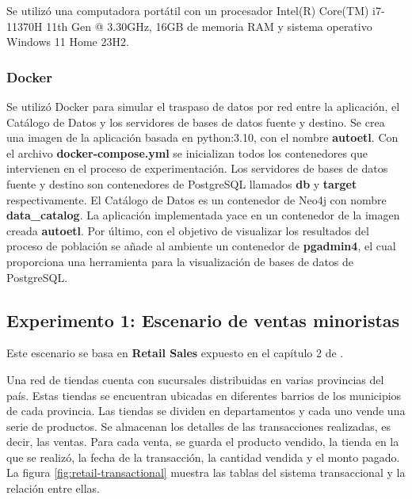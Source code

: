 Se utilizó una computadora portátil con un procesador Intel(R) Core(TM) i7-11370H 11th Gen @ 3.30GHz, 16GB de 
memoria RAM y sistema operativo Windows 11 Home 23H2.

\subsubsection{Docker}

Se utilizó Docker para simular el traspaso de datos por red entre la aplicación, el Catálogo de Datos y 
los servidores de bases de datos fuente y destino. Se crea una imagen de la aplicación basada en python:3.10, con el 
nombre \textbf{autoetl}. 
Con el archivo \textbf{docker-compose.yml} se inicializan todos los contenedores que intervienen en el proceso 
de experimentación. Los servidores de bases de datos fuente y destino son contenedores de PostgreSQL llamados 
\textbf{db} y \textbf{target} respectivamente. El Catálogo de Datos es un contenedor de Neo4j con nombre 
\textbf{data\_catalog}. La aplicación implementada yace en un contenedor de la imagen creada \textbf{autoetl}. 
Por \'ultimo, con el objetivo de visualizar los resultados del proceso de población se añade al ambiente un 
contenedor de \textbf{pgadmin4}, el cual proporciona una herramienta para la visualización de bases de datos 
de PostgreSQL.

\subsection{Experimento 1: Escenario de ventas minoristas}

Este escenario se basa en \textbf{Retail Sales} expuesto en el capítulo 2
de \cite{kimball2011data}. 

Una red de tiendas cuenta con sucursales distribuidas en varias provincias del país. Estas tiendas se encuentran ubicadas 
en diferentes barrios de los municipios de cada provincia. Las tiendas se dividen en departamentos y cada uno vende 
una serie de productos. Se almacenan los detalles de las transacciones realizadas, es decir, las ventas. Para cada venta, se guarda 
el producto vendido, la tienda en la que se realizó, la fecha de la transacción, la cantidad vendida y el monto pagado.
La figura \ref{fig:retail-transactional} muestra las tablas del sistema transaccional y la relación entre ellas.

